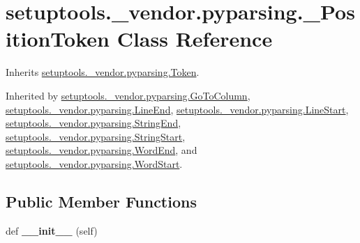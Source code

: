 \hypertarget{classsetuptools_1_1__vendor_1_1pyparsing_1_1___position_token}{}\section{setuptools.\+\_\+vendor.\+pyparsing.\+\_\+\+Position\+Token Class Reference}
\label{classsetuptools_1_1__vendor_1_1pyparsing_1_1___position_token}


Inherits \hyperlink{classsetuptools_1_1__vendor_1_1pyparsing_1_1_token}{setuptools.\+\_\+vendor.\+pyparsing.\+Token}.



Inherited by \hyperlink{classsetuptools_1_1__vendor_1_1pyparsing_1_1_go_to_column}{setuptools.\+\_\+vendor.\+pyparsing.\+Go\+To\+Column}, \hyperlink{classsetuptools_1_1__vendor_1_1pyparsing_1_1_line_end}{setuptools.\+\_\+vendor.\+pyparsing.\+Line\+End}, \hyperlink{classsetuptools_1_1__vendor_1_1pyparsing_1_1_line_start}{setuptools.\+\_\+vendor.\+pyparsing.\+Line\+Start}, \hyperlink{classsetuptools_1_1__vendor_1_1pyparsing_1_1_string_end}{setuptools.\+\_\+vendor.\+pyparsing.\+String\+End}, \hyperlink{classsetuptools_1_1__vendor_1_1pyparsing_1_1_string_start}{setuptools.\+\_\+vendor.\+pyparsing.\+String\+Start}, \hyperlink{classsetuptools_1_1__vendor_1_1pyparsing_1_1_word_end}{setuptools.\+\_\+vendor.\+pyparsing.\+Word\+End}, and \hyperlink{classsetuptools_1_1__vendor_1_1pyparsing_1_1_word_start}{setuptools.\+\_\+vendor.\+pyparsing.\+Word\+Start}.

\subsection*{Public Member Functions}
\begin{DoxyCompactItemize}
\item 
\mbox{\label{classsetuptools_1_1__vendor_1_1pyparsing_1_1___position_token_aac4710f156cf3b3ce54e6ecf6761ac83}} 
def {\bfseries \+\_\+\+\_\+init\+\_\+\+\_\+} (self)
\end{DoxyCompactItemize}
